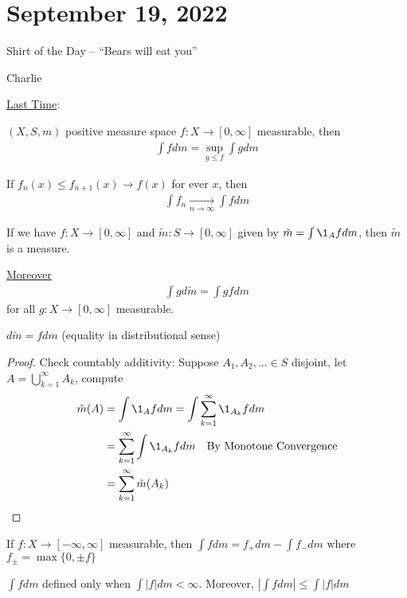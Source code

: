 \section{September 19, 2022}

\epigraph{Shirt of the Day -- ``Bears will eat you''}{Charlie}

\underline{Last Time}:

$(X,S, m)$ positive measure space $f : X \to [0,\infty]$ measurable, then
 \begin{align*}
\int f dm = \sup_{g \leq f} \int g dm
\end{align*}


\begin{theorem}
	If $f_n(x) \leq f_{n+1}(x) \to f(x)$ for ever $x$, then
	\begin{align*}
		\int f_n \xrightarrow[n \to \infty]{} \int f dm
	\end{align*}
\end{theorem}

\begin{corollary}
	If we have $f: X \to [0,\infty]$ and $\tilde{m} : S \to [0,\infty]$ given by $\tilde{m} = \int \1_A fdm$, then $\tilde{m}$ is a measure.

	\underline{Moreover}
	\begin{align*}
		\int g d\tilde{m} = \int g f dm
	\end{align*} for all $g :X \to [0,\infty]$ measurable.

\end{corollary}

\begin{notation}
	$d \tilde{m} = f dm$ (equality in distributional sense)
\end{notation}

\begin{proof}
	Check countably additivity:
	Suppose $A_1, A_2, \ldots \in S$ disjoint, let  $A = \bigcup_{k=1}^{\infty} A_k$, compute
	\begin{align*}
		\tilde{m}(A) &= \int \1_{A} f dm
					 = \int \sum_{k=1}^{\infty} \1_{A_k} f dm \\
					 &= \sum_{k=1}^{\infty} \int \1_{A_k} f dm \quad \text{By Monotone Convergence} \\
					 &=  \sum_{k=1}^{\infty} \tilde{m}( A_k )
	\end{align*}
\end{proof}

\begin{definition}
	If $f: X \to [ - \infty, \infty]$ measurable, then  $\int f dm = f_{+} dm - \int f_{-} dm$ where
	$f_{\pm} = \max\{0, \pm f\}$
\begin{remark}
	$\int f dm$ defined only when $\int |f| dm < \infty$. Moreover,  $|\int f dm | \leq \int |f| dm$
\end{remark}
\end{definition}

